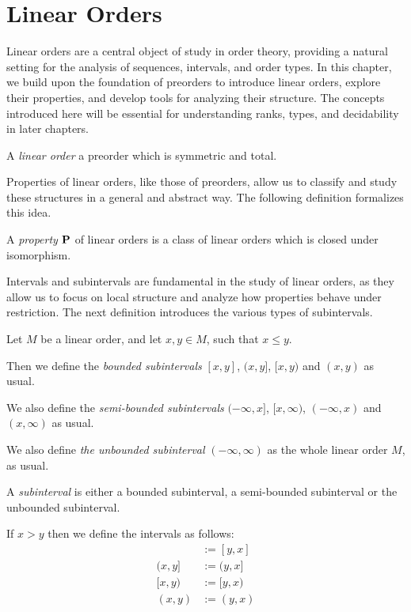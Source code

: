 \section{Linear Orders}

Linear orders are a central object of study in order theory, providing a natural setting for the analysis of sequences, intervals, and order types. In this chapter, we build upon the foundation of preorders to introduce linear orders, explore their properties, and develop tools for analyzing their structure. The concepts introduced here will be essential for understanding ranks, types, and decidability in later chapters.

\begin{definitions}
  A \emph{linear order} a preorder which is symmetric and total.
\end{definitions}

Properties of linear orders, like those of preorders, allow us to classify and study these structures in a general and
abstract way. The following definition formalizes this idea.

\begin{definition}
  A \emph{property} $\mathbf{P}$ of linear orders is a class of linear orders which
  is closed under isomorphism.
\end{definition}

Intervals and subintervals are fundamental in the study of linear orders, as they allow us to focus on local structure and
analyze how properties behave under restriction. The next definition introduces the various types of subintervals.

\begin{definition}[Subintervals]
  Let $M$ be a linear order,
  and let $x, y \in M$, such that $x \le y$.

  Then we define the \emph{bounded subintervals} $[x, y]$,
  $(x, y]$, $[x, y)$ and $(x, y)$ as usual.

          We also define the \emph{semi-bounded subintervals} $(-\infty, x]$,
  $[x, \infty)$, $(-\infty, x)$ and $(x, \infty)$ as usual.

  We also define \emph{the unbounded subinterval} $(-\infty, \infty)$ as the whole linear order $M$,
  as usual.

  A \emph{subinterval} is either
  a bounded subinterval, a semi-bounded subinterval or the unbounded subinterval.

  If $x > y$ then we define the intervals as follows:
  \begin{align*}
    [x, y] & := [y, x] \\
    (x, y] & := (y, x] \\
    [x, y) & := [y, x) \\
    (x, y) & := (y, x)
  \end{align*}

\end{definition}

